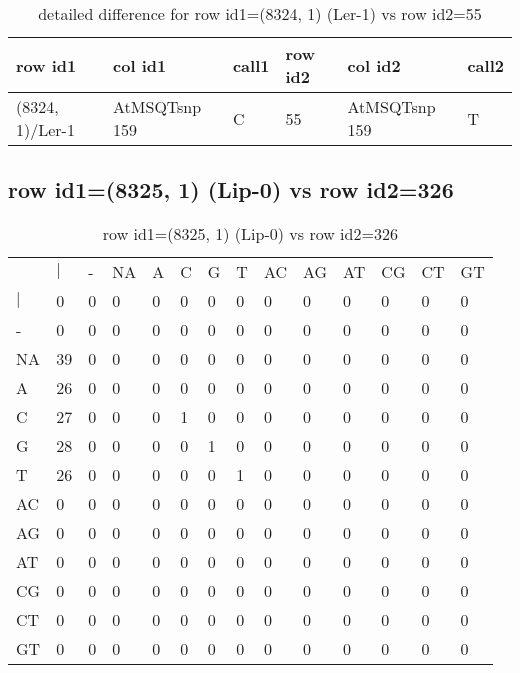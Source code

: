 \begin{center}
\begin{longtable}{|l|l|l|l|l|l|}
\caption{detailed difference for row id1=(8324, 1) (Ler-1) vs row id2=55} \label{table_dm327}\\
\hline
row id1&col id1&call1&row id2&col id2&call2\\
\hline
(8324, 1)/Ler-1&AtMSQTsnp 159&C&55&AtMSQTsnp 159&T\\
\hline
\end{longtable}
\end{center}

\subsection{row id1=(8325, 1) (Lip-0) vs row id2=326}
\begin{center}
\begin{longtable}{|l|l|l|l|l|l|l|l|l|l|l|l|l|l|}
\caption{row id1=(8325, 1) (Lip-0) vs row id2=326} \label{table_dm328}\\
\hline
\\
\hline
&$|$&-&NA&A&C&G&T&AC&AG&AT&CG&CT&GT\\
$|$&0&0&0&0&0&0&0&0&0&0&0&0&0\\
-&0&0&0&0&0&0&0&0&0&0&0&0&0\\
NA&39&0&0&0&0&0&0&0&0&0&0&0&0\\
A&26&0&0&0&0&0&0&0&0&0&0&0&0\\
C&27&0&0&0&1&0&0&0&0&0&0&0&0\\
G&28&0&0&0&0&1&0&0&0&0&0&0&0\\
T&26&0&0&0&0&0&1&0&0&0&0&0&0\\
AC&0&0&0&0&0&0&0&0&0&0&0&0&0\\
AG&0&0&0&0&0&0&0&0&0&0&0&0&0\\
AT&0&0&0&0&0&0&0&0&0&0&0&0&0\\
CG&0&0&0&0&0&0&0&0&0&0&0&0&0\\
CT&0&0&0&0&0&0&0&0&0&0&0&0&0\\
GT&0&0&0&0&0&0&0&0&0&0&0&0&0\\
\hline
\end{longtable}
\end{center}

